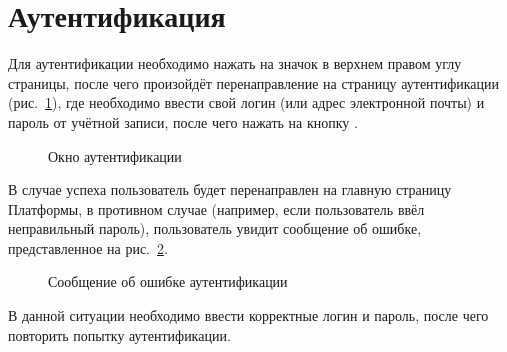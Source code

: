 \section{Аутентификация} \label{sec:authorization}
	Для аутентификации необходимо нажать на значок  в верхнем правом углу страницы, после чего произойдёт перенаправление на страницу аутентификации (рис.~\ref{img:authorization:authorization_page}), где необходимо ввести свой логин (или адрес электронной почты) и пароль от учётной записи, после чего нажать на кнопку .
	\begin{figure}[H]
		\caption{Окно аутентификации}
		\label{img:authorization:authorization_page}
	\end{figure}
	
	В случае успеха пользователь будет перенаправлен на главную страницу Платформы, в противном случае (например, если пользователь ввёл неправильный пароль), пользователь увидит сообщение об ошибке, представленное на рис.~\ref{img:authorization:authorization_page_error}.
	\begin{figure}[H]
		\caption{Сообщение об ошибке аутентификации}
		\label{img:authorization:authorization_page_error}
	\end{figure}
	
	В данной ситуации необходимо ввести корректные логин и пароль, после чего повторить попытку аутентификации.